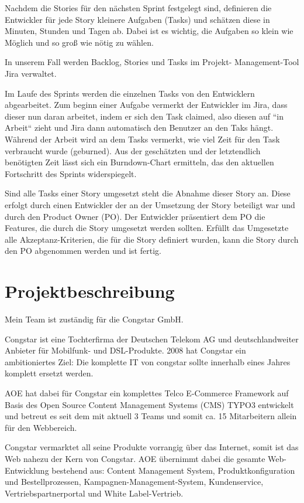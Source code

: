 \documentclass[11pt,a4paper]{article} %
\begin{document}
Nachdem die Stories für den nächsten Sprint festgelegt sind, definieren die Entwickler für jede Story kleinere Aufgaben (Tasks) und schätzen diese in Minuten, Stunden und Tagen ab. Dabei ist es wichtig, die Aufgaben so klein wie Möglich und so groß wie nötig zu wählen.

In unserem Fall werden Backlog, Stories und Tasks im Projekt-
Management-Tool Jira verwaltet.

Im Laufe des Sprints werden die einzelnen Tasks von den Entwicklern abgearbeitet.
Zum beginn einer Aufgabe vermerkt der Entwickler im Jira, dass dieser nun daran arbeitet, indem er sich den Task claimed, also diesen auf “in Arbeit“ zieht und Jira dann automatisch den Benutzer an den Taks hängt.
Während der Arbeit wird an dem Tasks vermerkt, wie viel Zeit für den Task verbraucht wurde (geburned). Aus der
geschätzten und der letztendlich benötigten Zeit lässt sich ein Burndown-Chart ermitteln, das den aktuellen Fortschritt des Sprints widerspiegelt.

Sind alle Tasks einer Story umgesetzt steht die Abnahme dieser Story an. Diese erfolgt durch einen Entwickler der an der Umsetzung der Story beteiligt war und durch den Product Owner (PO).
Der Entwickler präsentiert dem PO die Features, die durch die Story umgesetzt werden sollten.
Erfüllt das Umgesetzte alle Akzeptanz-Kriterien, die für die Story definiert wurden, kann die Story durch den PO abgenommen werden und ist fertig.

\section{Projektbeschreibung} \label{sec:projekt}

Mein Team ist zuständig für die Congstar GmbH.

Congstar ist eine Tochterfirma der Deutschen Telekom AG und deutschlandweiter Anbieter für Mobilfunk- und DSL-Produkte.
2008 hat Congstar ein ambitioniertes Ziel: Die komplette IT von congstar sollte innerhalb eines Jahres komplett ersetzt werden.

AOE hat dabei für Congstar ein komplettes Telco E-Commerce Framework auf Basis des Open Source Content Management Systems (CMS) TYPO3 entwickelt und betreut es seit dem mit aktuell 3 Teams und somit ca. 15 Mitarbeitern allein für den Webbereich.

Congstar vermarktet all seine Produkte vorrangig über das Internet, somit ist das Web nahezu der Kern von Congstar. AOE übernimmt dabei die gesamte Web-Entwicklung bestehend aus: Content Management System, Produktkonfiguration und Bestellprozessen, Kampagnen-Management-System, Kundenservice, Vertriebspartnerportal und White Label-Vertrieb.
\end{document}
